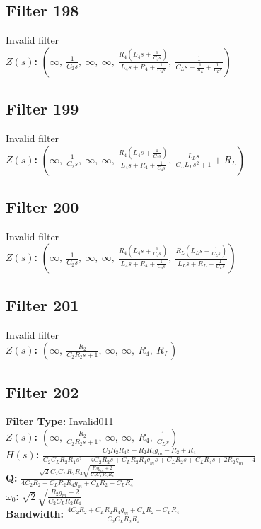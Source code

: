 \documentclass{article}
\begin{document}
\subsection*{Filter 198}
Invalid filter \\ 
\textbf{$Z(s)$:} $\left( \infty, \  \frac{1}{C_{2} s}, \  \infty, \  \infty, \  \frac{R_{4} \left(L_{4} s + \frac{1}{C_{4} s}\right)}{L_{4} s + R_{4} + \frac{1}{C_{4} s}}, \  \frac{1}{C_{L} s + \frac{1}{R_{L}} + \frac{1}{L_{L} s}}\right)$ \\ 
\subsection*{Filter 199}
Invalid filter \\ 
\textbf{$Z(s)$:} $\left( \infty, \  \frac{1}{C_{2} s}, \  \infty, \  \infty, \  \frac{R_{4} \left(L_{4} s + \frac{1}{C_{4} s}\right)}{L_{4} s + R_{4} + \frac{1}{C_{4} s}}, \  \frac{L_{L} s}{C_{L} L_{L} s^{2} + 1} + R_{L}\right)$ \\ 
\subsection*{Filter 200}
Invalid filter \\ 
\textbf{$Z(s)$:} $\left( \infty, \  \frac{1}{C_{2} s}, \  \infty, \  \infty, \  \frac{R_{4} \left(L_{4} s + \frac{1}{C_{4} s}\right)}{L_{4} s + R_{4} + \frac{1}{C_{4} s}}, \  \frac{R_{L} \left(L_{L} s + \frac{1}{C_{L} s}\right)}{L_{L} s + R_{L} + \frac{1}{C_{L} s}}\right)$ \\ 
\subsection*{Filter 201}
Invalid filter \\ 
\textbf{$Z(s)$:} $\left( \infty, \  \frac{R_{2}}{C_{2} R_{2} s + 1}, \  \infty, \  \infty, \  R_{4}, \  R_{L}\right)$ \\ 
\subsection*{Filter 202}
\textbf{Filter Type:} Invalid011 \\ 
\textbf{$Z(s)$:} $\left( \infty, \  \frac{R_{2}}{C_{2} R_{2} s + 1}, \  \infty, \  \infty, \  R_{4}, \  \frac{1}{C_{L} s}\right)$ \\ 
\textbf{$H(s)$:} $\frac{C_{2} R_{2} R_{4} s + R_{2} R_{4} g_{m} - R_{2} + R_{4}}{C_{2} C_{L} R_{2} R_{4} s^{2} + 4 C_{2} R_{2} s + C_{L} R_{2} R_{4} g_{m} s + C_{L} R_{2} s + C_{L} R_{4} s + 2 R_{2} g_{m} + 4}$ \\ 
\textbf{Q:} $\frac{\sqrt{2} C_{2} C_{L} R_{2} R_{4} \sqrt{\frac{R_{2} g_{m} + 2}{C_{2} C_{L} R_{2} R_{4}}}}{4 C_{2} R_{2} + C_{L} R_{2} R_{4} g_{m} + C_{L} R_{2} + C_{L} R_{4}}$ \\ 
\textbf{$\omega_0$:} $\sqrt{2} \sqrt{\frac{R_{2} g_{m} + 2}{C_{2} C_{L} R_{2} R_{4}}}$ \\ 
\textbf{Bandwidth:} $\frac{4 C_{2} R_{2} + C_{L} R_{2} R_{4} g_{m} + C_{L} R_{2} + C_{L} R_{4}}{C_{2} C_{L} R_{2} R_{4}}$ \\ 
\end{document}
